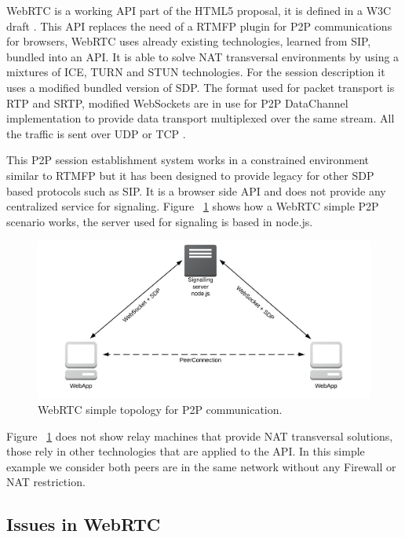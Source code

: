 WebRTC is a working API part of the HTML5 proposal, it is defined in a W3C draft \cite{webrtcW3cgroup}. This API replaces the need of a RTMFP plugin for P2P communications for browsers, WebRTC uses already existing technologies, learned from SIP, bundled into an API. It is able to solve NAT transversal environments by using a mixtures of ICE, TURN and STUN technologies. For the session description it uses a modified bundled version of SDP. The format used for packet transport is RTP and SRTP, modified WebSockets are in use for P2P DataChannel implementation to provide data transport multiplexed over the same stream. All the traffic is sent over UDP or TCP \cite{alvestrandOverview2012}.

This P2P session establishment system works in a constrained environment similar to RTMFP but it has been designed to provide legacy for other SDP based protocols such as SIP. It is a browser side API and does not provide any centralized service for signaling. Figure ~\ref{fig:webrtcExample} shows how a WebRTC simple P2P scenario works, the server used for signaling is based in node.js.

 \begin{figure}[h]
  \centering
    \includegraphics[width=1\textwidth]{./figures/webrtcExample.png}
      \caption[WebRTC simple topology for P2P communication]{WebRTC simple topology for P2P communication.}
	\label{fig:webrtcExample}
\end{figure}

Figure ~\ref{fig:webrtcExample} does not show relay machines that provide NAT transversal solutions, those rely in other technologies that are applied to the API. In this simple example we consider both peers are in the same network without any Firewall or NAT restriction.

\subsection{Issues in WebRTC}


